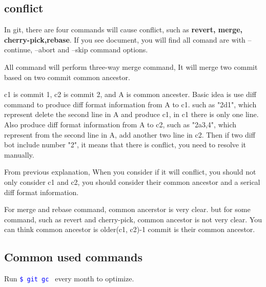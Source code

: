 \documentclass[paper=8.5in:11in, twoside, 12pt, pagesize=pdftex]{book}
\newcommand{\linuxcommand}[1]{\texttt{\textcolor{blue}{\$ #1 \Pisymbol{psy}{191}}}}
\begin{document}
%		
%		
%		
%		

\subsection{conflict}

	In git, there are four commands will cause conflict, such as \textbf{revert, merge, cherry-pick,rebase}. If you see document, you will find all comand are with --continue, --abort and --skip command options.
	
	All command will perform three-way merge command, It will merge two commit based on two commit common ancestor.
	
	c1 is commit 1, c2 is commit 2, and A is common ancester. Basic idea is use diff command to produce diff format information from A to c1. such as "2d1", which represent delete the second line in A and produce c1, in c1 there is only one line.  Also produce diff format information from A to c2, such as "2a3,4", which represent from the second line in A, add another two line in c2. Then if two diff bot include number "2", it means that there is conflict, you need to resolve it manually. 
	
	From previous explanation, When you consider if it will conflict, you should not only consider c1 and c2, you should consider their common ancestor and a serical diff format information. 
	
	For merge and rebase command, common ancerstor is very clear. but for some command, such as revert and cherry-pick, common ancestor is not very clear. You can think common ancestor is older(c1, c2)-1 commit is their common ancestor.  	

\subsection{Common used commands}
	Run \linuxcommand{git gc} every month to optimize.
		
\end{document}
